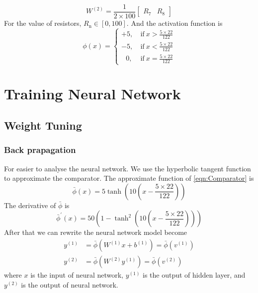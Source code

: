 \documentclass[a4paper, 12pt, AutoFakeBold]{report}
\begin{document}
    \begin{equation}
        W^{(2)} =\frac{1}{2\times100}
        \begin{bmatrix}
            R_7 & R_8
        \end{bmatrix}
    \end{equation}
    For the value of resistors, $R_\text{n} \in [0, 100]$. And the activation function is
    \begin{equation}
        \phi(x) = \begin{cases}
            +5,\ &\text{if}\ x>\frac{5\times22}{122} \\
            -5,\ &\text{if}\ x<\frac{5\times22}{122} \\
            \ \ \ 0,\ &\text{if}\ x=\frac{5\times22}{122}
        \end{cases}
        \label{eqn:Comparator}
    \end{equation}


    \chapter{Training Neural Network}
    \section{Weight Tuning}
    \subsection{Back prapagation}
    For easier to analyse the neural network. We use the hyperbolic tangent function to approximate the comparator. The approximate function of \eqref{eqn:Comparator} is
    \begin{equation}
        \bar{\phi}(x) = 5\tanh\left(10\left(x-\frac{5\times22}{122}\right)\right)
        \label{eqn:Approx_comp}
    \end{equation}
    The derivative of $\bar{\phi}$ is
    \begin{equation}
        \bar{\phi}^\prime(x) = 50\left(1-\tanh^2\left(10\left(x-\frac{5\times22}{122}\right)\right)\right)
        \label{eqn:Approx_comp_derivative}
    \end{equation}
    After that we can rewrite the neural network model become
    \begin{align}
        y^{(1)} &=
        \bar{\phi}\left(W^{(1)}x+b^{(1)}\right) =
        \bar{\phi}\left(v^{(1)}\right) \\
        y^{(2)} &=
        \bar{\phi}\left(W^{(2)}y^{(1)}\right) =
        \bar{\phi}\left(v^{(2)}\right)
    \end{align}
    where $x$ is the input of neural network, $y^{(1)}$ is the output of hidden layer, and $y^{(2)}$ is the output of neural network.
\end{document}
